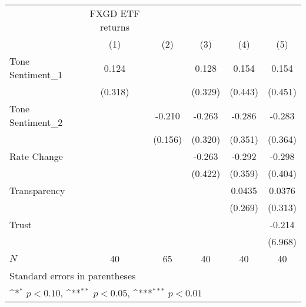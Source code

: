 {
\def\sym#1{\ifmmode^{#1}\else\(^{#1}\)\fi}
\begin{tabular}{l*{5}{c}}
\hline\hline
            &FXGD ETF returns         &                     &                     &                     &                     \\
            &\multicolumn{1}{c}{(1)}         &\multicolumn{1}{c}{(2)}         &\multicolumn{1}{c}{(3)}         &\multicolumn{1}{c}{(4)}         &\multicolumn{1}{c}{(5)}         \\
\hline
Tone Sentiment\_{1}&       0.124         &                     &       0.128         &       0.154         &       0.154         \\
            &     (0.318)         &                     &     (0.329)         &     (0.443)         &     (0.451)         \\
[1em]
Tone Sentiment\_{2}&                     &      -0.210         &      -0.263         &      -0.286         &      -0.283         \\
            &                     &     (0.156)         &     (0.320)         &     (0.351)         &     (0.364)         \\
[1em]
Rate Change &                     &                     &      -0.263         &      -0.292         &      -0.298         \\
            &                     &                     &     (0.422)         &     (0.359)         &     (0.404)         \\
[1em]
Transparency&                     &                     &                     &      0.0435         &      0.0376         \\
            &                     &                     &                     &     (0.269)         &     (0.313)         \\
[1em]
Trust       &                     &                     &                     &                     &      -0.214         \\
            &                     &                     &                     &                     &     (6.968)         \\
\hline
\(N\)       &          40         &          65         &          40         &          40         &          40         \\
\hline\hline
\multicolumn{6}{l}{\footnotesize Standard errors in parentheses}\\
\multicolumn{6}{l}{\footnotesize \sym{*} \(p<0.10\), \sym{**} \(p<0.05\), \sym{***} \(p<0.01\)}\\
\end{tabular}
}
